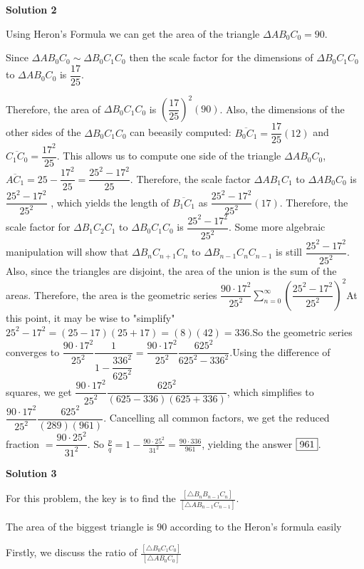 \begin{enumerate}
 



\textbf{Solution 2}

Using Heron's Formula we can get the area of the triangle $\Delta AB_0C_0 = 90$. 

 Since $\Delta AB_0C_0 \sim \Delta B_0C_1C_0$ then the scale factor for the dimensions of  $\Delta B_0C_1C_0$ to $\Delta AB_0C_0$ is $\dfrac{17}{25}.$ 

 Therefore, the area of $\Delta B_0C_1C_0$ is $(\dfrac{17}{25})^2(90)$. Also, the dimensions of the other sides of the $\Delta B_0C_1C_0$ can beeasily computed: $\overline{B_0C_1}= \dfrac{17}{25}(12)$ and $\overline{C_1C_0} = \dfrac{17^2}{25}$. This allows us to compute one side of the triangle $\Delta AB_0C_0$, $\overline{AC_1} = 25 - \dfrac{17^2}{25} = \dfrac{25^2 - 17^2}{25}$. Therefore, the scale factor $\Delta AB_1C_1$ to $\Delta AB_0C_0$ is $\dfrac{25^2 - 17^2}{25^2}$ , which yields the length of $\overline{B_1C_1}$ as $\dfrac{25^2 - 17^2}{25^2}(17)$. Therefore, the scale factor for $\Delta B_1C_2C_1$ to $\Delta B_0C_1C_0$ is $\dfrac{25^2 - 17^2}{25^2}$. Some more algebraic manipulation will show that  $\Delta B_nC_{n+1}C_n$ to $\Delta B_{n-1}C_nC_{n-1}$ is still $\dfrac{25^2 - 17^2}{25^2}$.  Also, since the triangles are disjoint, the area of the union is the sum of the areas. Therefore, the area is the geometric series $\dfrac{90 \cdot 17^2}{25^2} \sum_{n=0}^{\infty} (\dfrac{25^2-17^2}{25^2})^2$At this point, it may be wise to "simplify" $25^2 - 17^2 = (25-17)(25+17) = (8)(42) = 336$.So the geometric series converges to $\dfrac{90 \cdot 17^2}{25^2} \dfrac{1}{1 - \dfrac{336^2}{625^2}} = \dfrac{90 \cdot 17^2}{25^2} \dfrac{625^2}{625^2 - 336^2}$.Using the difference of squares, we get $\dfrac{90 \cdot 17^2}{25^2}\dfrac{625^2}{(625 - 336)(625 + 336)}$, which simplifies to  $\dfrac{90 \cdot 17^2}{25^2} \dfrac{625^2}{(289)(961)}$. Cancelling all common factors, we get the reduced fraction  $= \dfrac{90 \cdot 25^2}{31^2}$. So $\frac{p}{q}=1-\frac{90 \cdot 25^2}{31^2}=\frac{90 \cdot 336}{961}$, yielding the answer $\fbox{961}$.

 



\textbf{Solution 3}

For this problem, the key is to find the $\frac{[\triangle{B_nB_{n-1}C_n}]}{[\triangle{AB_{n-1}C_{n-1}}]}$.

 The area of the biggest triangle is $90$ according to the Heron's formula easily

 Firstly, we discuss the ratio of  $\frac{[\triangle{B_0C_1C_0}]}{[\triangle{AB_0C_0}]}$ 


\end{enumerate}
